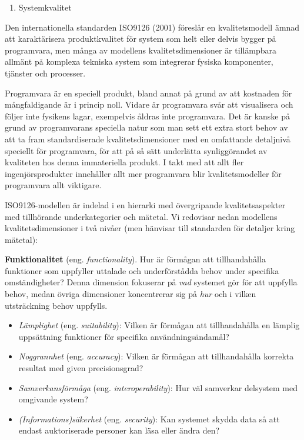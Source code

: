 \begin{enumerate}
\def\labelenumi{\arabic{enumi}.}
\item
  Systemkvalitet
\end{enumerate}

Den internationella standarden ISO9126 (2001) föreslår en
kvalitetsmodell ämnad att karaktärisera produktkvalitet för system som
helt eller delvis bygger på programvara, men många av modellens
kvalitetsdimensioner är tillämpbara allmänt på komplexa tekniska system
som integrerar fysiska komponenter, tjänster och processer.

Programvara är en speciell produkt, bland annat på grund av att
kostnaden för mångfaldigande är i princip noll. Vidare är programvara
svår att visualisera och följer inte fysikens lagar, exempelvis åldras
inte programvara. Det är kanske på grund av programvarans speciella
natur som man sett ett extra stort behov av att ta fram standardiserade
kvalitetsdimensioner med en omfattande detaljnivå speciellt för
programvara, för att på så sätt underlätta synliggörandet av kvaliteten
hos denna immateriella produkt. I takt med att allt fler
ingenjörsprodukter innehåller allt mer programvara blir
kvalitetsmodeller för programvara allt viktigare.

ISO9126-modellen är indelad i en hierarki med övergripande
kvalitetsaspekter med tillhörande underkategorier och mätetal. Vi
redovisar nedan modellens kvalitetsdimensioner i två nivåer (men
hänvisar till standarden för detaljer kring mätetal):

\textbf{Funktionalitet} (eng. \emph{functionality}). Hur är förmågan att
tillhandahålla funktioner som uppfyller uttalade och underförstådda
behov under specifika omständigheter? Denna dimension fokuserar på
\emph{vad} systemet gör för att uppfylla behov, medan övriga dimensioner
koncentrerar sig på \emph{hur} och i vilken utsträckning behov uppfylls.

\begin{itemize}
\item
  \emph{Lämplighet} (eng. \emph{suitability}): Vilken är förmågan att
  tillhandahålla en lämplig uppsättning funktioner för specifika
  användningsändamål?
\item
  \emph{Noggrannhet} (eng. \emph{accuracy}): Vilken är förmågan att
  tillhandahålla korrekta resultat med given precisionsgrad?
\item
  \emph{Samverkansförmåga} (eng. \emph{interoperability}): Hur väl
  samverkar delsystem med omgivande system?
\item
  \emph{(Informations)säkerhet} (eng. \emph{security}): Kan systemet
  skydda data så att endast auktoriserade personer kan läsa eller ändra
  den?
\end{itemize}

